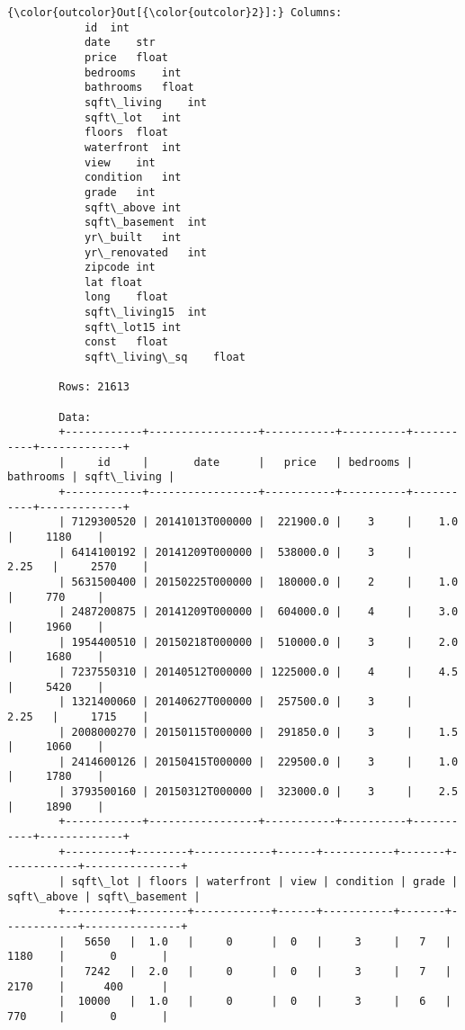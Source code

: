 \documentclass[11pt]{article}
\begin{document}
    
\begin{Verbatim}[commandchars=\\\{\}]
{\color{outcolor}Out[{\color{outcolor}2}]:} Columns:
        	id	int
        	date	str
        	price	float
        	bedrooms	int
        	bathrooms	float
        	sqft\_living	int
        	sqft\_lot	int
        	floors	float
        	waterfront	int
        	view	int
        	condition	int
        	grade	int
        	sqft\_above	int
        	sqft\_basement	int
        	yr\_built	int
        	yr\_renovated	int
        	zipcode	int
        	lat	float
        	long	float
        	sqft\_living15	int
        	sqft\_lot15	int
        	const	float
        	sqft\_living\_sq	float
        
        Rows: 21613
        
        Data:
        +------------+-----------------+-----------+----------+-----------+-------------+
        |     id     |       date      |   price   | bedrooms | bathrooms | sqft\_living |
        +------------+-----------------+-----------+----------+-----------+-------------+
        | 7129300520 | 20141013T000000 |  221900.0 |    3     |    1.0    |     1180    |
        | 6414100192 | 20141209T000000 |  538000.0 |    3     |    2.25   |     2570    |
        | 5631500400 | 20150225T000000 |  180000.0 |    2     |    1.0    |     770     |
        | 2487200875 | 20141209T000000 |  604000.0 |    4     |    3.0    |     1960    |
        | 1954400510 | 20150218T000000 |  510000.0 |    3     |    2.0    |     1680    |
        | 7237550310 | 20140512T000000 | 1225000.0 |    4     |    4.5    |     5420    |
        | 1321400060 | 20140627T000000 |  257500.0 |    3     |    2.25   |     1715    |
        | 2008000270 | 20150115T000000 |  291850.0 |    3     |    1.5    |     1060    |
        | 2414600126 | 20150415T000000 |  229500.0 |    3     |    1.0    |     1780    |
        | 3793500160 | 20150312T000000 |  323000.0 |    3     |    2.5    |     1890    |
        +------------+-----------------+-----------+----------+-----------+-------------+
        +----------+--------+------------+------+-----------+-------+------------+---------------+
        | sqft\_lot | floors | waterfront | view | condition | grade | sqft\_above | sqft\_basement |
        +----------+--------+------------+------+-----------+-------+------------+---------------+
        |   5650   |  1.0   |     0      |  0   |     3     |   7   |    1180    |       0       |
        |   7242   |  2.0   |     0      |  0   |     3     |   7   |    2170    |      400      |
        |  10000   |  1.0   |     0      |  0   |     3     |   6   |    770     |       0       |

\end{Verbatim}
\end{document}
